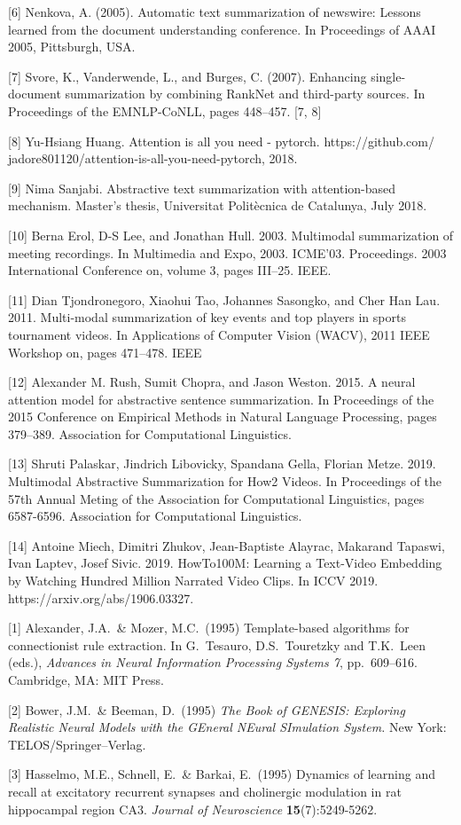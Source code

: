 \documentclass{article}
\begin{document}
{[6] Nenkova, A. (2005). Automatic text summarization of newswire: Lessons learned from the document understanding conference. In Proceedings of AAAI 2005, Pittsburgh, USA.

[7] Svore, K., Vanderwende, L., and Burges, C. (2007). Enhancing single-document summarization by combining RankNet and third-party sources. In Proceedings of the EMNLP-CoNLL, pages 448–457. [7, 8] 

[8] Yu-Hsiang Huang. Attention is all you need - pytorch. https://github.com/ jadore801120/attention-is-all-you-need-pytorch, 2018.

[9] Nima Sanjabi. Abstractive text summarization with attention-based mechanism. Master’s thesis, Universitat Politècnica de Catalunya, July 2018.

[10] Berna Erol, D-S Lee, and Jonathan Hull. 2003. Multimodal summarization of meeting recordings. In Multimedia and Expo, 2003. ICME’03. Proceedings. 2003 International Conference on, volume 3, pages III–25. IEEE.

[11] Dian Tjondronegoro, Xiaohui Tao, Johannes Sasongko, and Cher Han Lau. 2011. Multi-modal summarization of key events and top players in sports tournament videos. In Applications of Computer Vision (WACV), 2011 IEEE Workshop on, pages 471–478. IEEE

[12] Alexander M. Rush, Sumit Chopra, and Jason Weston. 2015. A neural attention model for abstractive sentence summarization. In Proceedings of the 2015 Conference on Empirical Methods in Natural Language Processing, pages 379–389. Association for Computational Linguistics.

[13] Shruti Palaskar, Jindrich Libovicky, Spandana Gella, Florian Metze. 2019. Multimodal Abstractive Summarization for How2 Videos. In Proceedings of the 57th Annual Meting of the Association for Computational Linguistics, pages 6587-6596. Association for Computational Linguistics.

[14] Antoine Miech, Dimitri Zhukov, Jean-Baptiste Alayrac, Makarand Tapaswi, Ivan Laptev, Josef Sivic. 2019. HowTo100M: Learning a Text-Video Embedding by Watching Hundred Million Narrated Video Clips. In ICCV 2019. https://arxiv.org/abs/1906.03327.



[1] Alexander, J.A.\ \& Mozer, M.C.\ (1995) Template-based algorithms for
connectionist rule extraction. In G.\ Tesauro, D.S.\ Touretzky and T.K.\ Leen
(eds.), {\it Advances in Neural Information Processing Systems 7},
pp.\ 609--616. Cambridge, MA: MIT Press.

[2] Bower, J.M.\ \& Beeman, D.\ (1995) {\it The Book of GENESIS: Exploring
  Realistic Neural Models with the GEneral NEural SImulation System.}  New York:
TELOS/Springer--Verlag.

[3] Hasselmo, M.E., Schnell, E.\ \& Barkai, E.\ (1995) Dynamics of learning and
recall at excitatory recurrent synapses and cholinergic modulation in rat
hippocampal region CA3. {\it Journal of Neuroscience} {\bf 15}(7):5249-5262.
}
\end{document}
